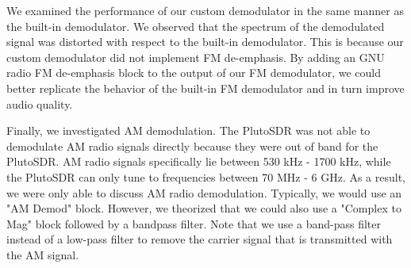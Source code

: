 \documentclass{article}
\begin{document}
We examined the performance of our custom demodulator in the same manner as the built-in demodulator. We observed that the spectrum of the demodulated signal was distorted with respect to the built-in demodulator. This is because our custom demodulator did not implement FM de-emphasis. By adding an GNU radio FM de-emphasis block to the output of our FM demodulator, we could better replicate the behavior of the built-in FM demodulator and in turn improve audio quality.

Finally, we investigated AM demodulation. The PlutoSDR was not able to demodulate AM radio signals directly because they were out of band for the PlutoSDR. AM radio signals specifically lie between 530 kHz - 1700 kHz, while the PlutoSDR can only tune to frequencies between 70 MHz - 6 GHz. As a result, we were only able to discuss AM radio demodulation. Typically, we would use an "AM Demod" block. However, we theorized that we could also use a "Complex to Mag" block followed by a bandpass filter. Note that we use a band-pass filter instead of a low-pass filter to remove the carrier signal that is transmitted with the AM signal.

%
%
	
\end{document}
